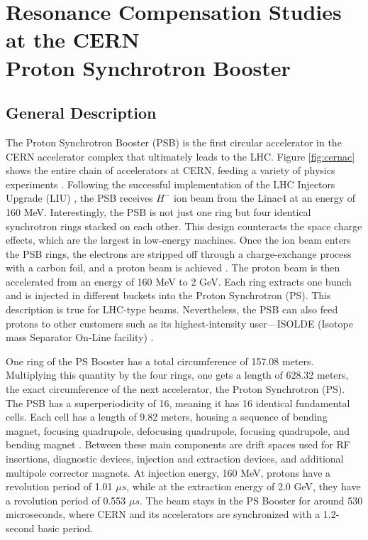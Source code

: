 \chapter{Resonance Compensation Studies at the CERN \\Proton Synchrotron Booster}
\label{sec:ch5}

\section{General Description}
The Proton Synchrotron Booster (PSB) is the first circular accelerator in the CERN accelerator complex that ultimately leads to the LHC. Figure \ref{fig:cernac} shows the entire chain of accelerators at CERN, feeding a variety of physics experiments \cite{cernplot}. Following the successful implementation of the LHC Injectors Upgrade (LIU) \cite{liu}, the PSB receives $H^-$ ion beam from the Linac4 at an energy of 160 MeV. Interestingly, the PSB is not just one ring but four identical synchrotron rings stacked on each other. This design counteracts the space charge effects, which are the largest in low-energy machines. Once the ion beam enters the PSB rings, the electrons are stripped off through a charge-exchange process with a carbon foil, and a proton beam is achieved \cite{psbstrip}. The proton beam is then accelerated from an energy of 160 MeV to 2 GeV. Each ring extracts one bunch and is injected in different buckets into the Proton Synchrotron (PS). This description is true for LHC-type beams. Nevertheless, the PSB can also feed protons to other customers such as its highest-intensity user---ISOLDE (Isotope mass Separator On-Line facility) \cite{foteini1}.   

One ring of the PS Booster has a total circumference of 157.08 meters. Multiplying this quantity by the four rings, one gets a length of 628.32 meters, the exact circumference of the next accelerator, the Proton Synchrotron (PS). The PSB has a superperiodicity of 16, meaning it has 16 identical fundamental cells. Each cell has a length of 9.82 meters, housing a sequence of bending magnet, focusing quadrupole, defocusing quadrupole, focusing quadrupole, and bending magnet \cite{tirsithesis,foteinithesis}. Between these main components are drift spaces used for RF insertions, diagnostic devices, injection and extraction devices, and additional multipole corrector magnets. At injection energy, 160 MeV, protons have a revolution period of 1.01 $\mu s$, while at the extraction energy of 2.0 GeV, they have a revolution period of 0.553 $\mu s$. The beam stays in the PS Booster for around 530 microseconds, where CERN and its accelerators are synchronized with a 1.2-second basic period. 

